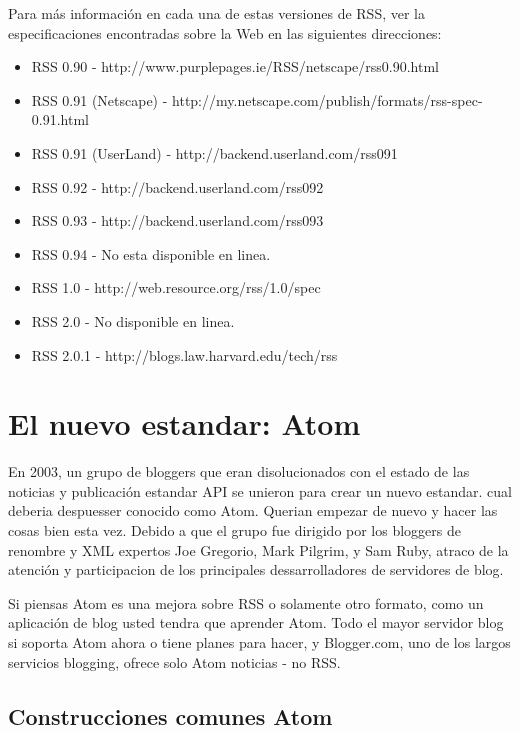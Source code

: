 Para más información en cada una de estas versiones de RSS, ver la especificaciones encontradas sobre la Web 
en las siguientes direcciones:

\begin{itemize}

\item RSS 0.90 - http://www.purplepages.ie/RSS/netscape/rss0.90.html
\item RSS 0.91 (Netscape) - http://my.netscape.com/publish/formats/rss-spec-0.91.html
\item RSS 0.91 (UserLand) - http://backend.userland.com/rss091
\item RSS 0.92 - http://backend.userland.com/rss092
\item RSS 0.93 - http://backend.userland.com/rss093
\item RSS 0.94 - No esta disponible en linea.
\item RSS 1.0 - http://web.resource.org/rss/1.0/spec
\item RSS 2.0 - No disponible en linea.
\item RSS 2.0.1 - http://blogs.law.harvard.edu/tech/rss

\end{itemize}

\section{El nuevo estandar: Atom}

En 2003, un grupo de bloggers que eran disolucionados con el estado de las noticias y publicación estandar API
se unieron para crear un nuevo estandar. cual deberia despuesser conocido como Atom. Querian empezar de nuevo y
hacer las cosas bien esta vez. Debido a que el grupo fue dirigido por los bloggers de renombre y XML expertos
Joe Gregorio, Mark Pilgrim, y Sam Ruby, atraco de la atención y participacion de los principales dessarrolladores
de servidores de blog.

Si piensas Atom es una mejora sobre RSS o solamente otro formato, como un aplicación de blog usted 
tendra que aprender Atom. Todo el mayor servidor blog si soporta Atom ahora o tiene planes para hacer, y Blogger.com,
uno de los largos servicios blogging, ofrece solo Atom noticias - no RSS.

\subsection{Construcciones comunes Atom}

